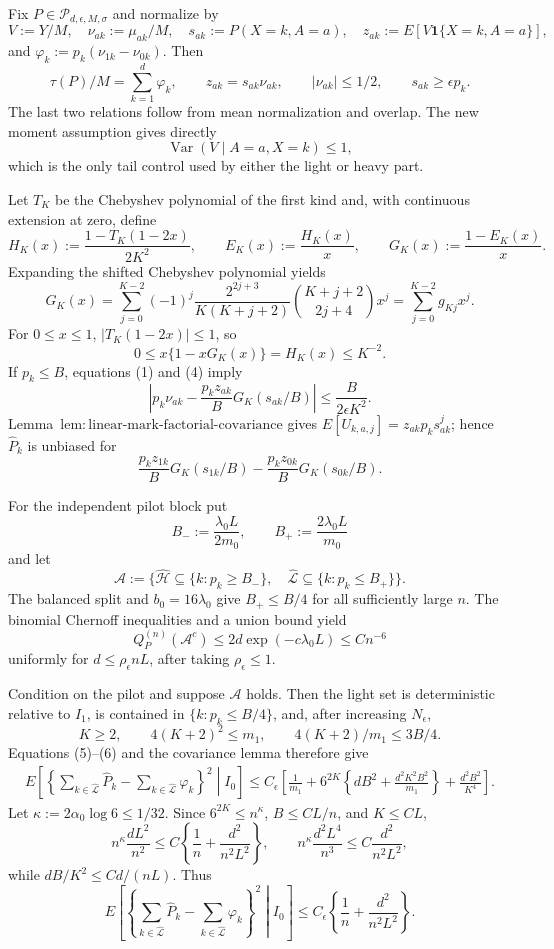 Fix \(P\in\mathcal P_{d,\epsilon,M,\sigma}\) and normalize by
\[
 V:=Y/M,\quad \nu_{ak}:=\mu_{ak}/M,\quad
 s_{ak}:=P(X=k,A=a),\quad z_{ak}:=E[V\mathbf 1\{X=k,A=a\}],
\]
and \(\varphi_k:=p_k(\nu_{1k}-\nu_{0k})\).  Then
\[
 \tau(P)/M=\sum_{k=1}^d\varphi_k,\qquad
 z_{ak}=s_{ak}\nu_{ak},\qquad |\nu_{ak}|\le1/2,\qquad s_{ak}\ge\epsilon p_k.
\tag{1}
\]
The last two relations follow from mean normalization and overlap.  The new moment assumption gives directly
\[
 \operatorname{Var}(V\mid A=a,X=k)\le1,
\tag{2}
\]
which is the only tail control used by either the light or heavy part.

Let \(T_K\) be the Chebyshev polynomial of the first kind and, with continuous extension at zero, define
\[
 H_K(x):=\frac{1-T_K(1-2x)}{2K^2},\qquad
 E_K(x):=\frac{H_K(x)}x,\qquad
 G_K(x):=\frac{1-E_K(x)}x.
\]
Expanding the shifted Chebyshev polynomial yields
\[
 G_K(x)=\sum_{j=0}^{K-2}(-1)^j
 \frac{2^{2j+3}}{K(K+j+2)}\binom{K+j+2}{2j+4}x^j
 =\sum_{j=0}^{K-2}g_{Kj}x^j.
\tag{3}
\]
For \(0\le x\le1\), \(|T_K(1-2x)|\le1\), so
\[
 0\le x\{1-xG_K(x)\}=H_K(x)\le K^{-2}.
\tag{4}
\]
If \(p_k\le B\), equations (1) and (4) imply
\[
 \left|p_k\nu_{ak}-\frac{p_kz_{ak}}B G_K(s_{ak}/B)\right|
 \le\frac{B}{2\epsilon K^2}.
\tag{5}
\]
Lemma~\(\mathrm{lem:linear\text{-}mark\text{-}factorial\text{-}covariance}\) gives \(E[U_{k,a,j}]=z_{ak}p_ks_{ak}^j\); hence \(\widehat P_k\) is unbiased for
\[
 \frac{p_kz_{1k}}B G_K(s_{1k}/B)-
 \frac{p_kz_{0k}}B G_K(s_{0k}/B).
\tag{6}
\]

For the independent pilot block put
\[
 B_-:=\frac{\lambda_0L}{2m_0},\qquad B_+:=\frac{2\lambda_0L}{m_0}
\]
and let
\[
 \mathcal A:=\{\widehat{\mathcal H}\subseteq\{k:p_k\ge B_-\},\quad
 \widehat{\mathcal L}\subseteq\{k:p_k\le B_+\}\}.
\]
The balanced split and \(b_0=16\lambda_0\) give \(B_+\le B/4\) for all sufficiently large \(n\).  The binomial Chernoff inequalities and a union bound yield
\[
 Q_P^{(n)}(\mathcal A^c)\le2d\exp(-c\lambda_0L)\le Cn^{-6}
\tag{7}
\]
uniformly for \(d\le\rho_\epsilon nL\), after taking \(\rho_\epsilon\le1\).

Condition on the pilot and suppose \(\mathcal A\) holds.  Then the light set is deterministic relative to \(I_1\), is contained in \(\{k:p_k\le B/4\}\), and, after increasing \(N_\epsilon\),
\[
 K\ge2,\qquad4(K+2)^2\le m_1,\qquad4(K+2)/m_1\le3B/4.
\tag{8}
\]
Equations (5)--(6) and the covariance lemma therefore give
\[
 \begin{split}
 E\left[\left\{\sum_{k\in\widehat{\mathcal L}}\widehat P_k-
 \sum_{k\in\widehat{\mathcal L}}\varphi_k\right\}^2\middle|I_0\right]
 \le C_\epsilon\left[\frac1{m_1}+6^{2K}\left\{dB^2+
 \frac{d^2K^2B^2}{m_1}\right\}+\frac{d^2B^2}{K^4}\right].
 \end{split}
\tag{9}
\]
Let \(\kappa:=2\alpha_0\log6\le1/32\).  Since \(6^{2K}\le n^\kappa\), \(B\le CL/n\), and \(K\le CL\),
\[
 n^\kappa\frac{dL^2}{n^2}\le C\left\{\frac1n+\frac{d^2}{n^2L^2}\right\},
 \qquad n^\kappa\frac{d^2L^4}{n^3}\le C\frac{d^2}{n^2L^2},
\tag{10}
\]
while \(dB/K^2\le Cd/(nL)\).  Thus
\[
 E\left[\left\{\sum_{k\in\widehat{\mathcal L}}\widehat P_k-
 \sum_{k\in\widehat{\mathcal L}}\varphi_k\right\}^2\middle|I_0\right]
 \le C_\epsilon\left\{\frac1n+\frac{d^2}{n^2L^2}\right\}.
\tag{11}
\]

